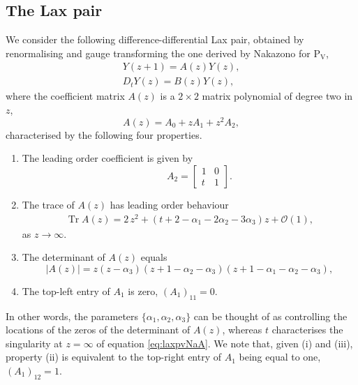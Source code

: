 \documentclass[a4paper,reqno]{amsart}
\numberwithin{equation}{section}
\numberwithin{figure}{section}
\theoremstyle{remark}
\newcommand\Pfive{\textrm{P}_{\textrm{V}}}
\begin{document}
\subsection{The Lax pair} \label{subsect:linP5Na}
We consider the following difference-differential Lax pair, obtained by renormalising and gauge transforming the one derived by Nakazono
\cite{nakazono_lax} for $\Pfive$,
\begin{subequations}\label{eq:laxpvNa}
\begin{align}
    Y(z+1)=A(z)Y(z),\label{eq:laxpvNaA}\\
    D_t Y(z)=B(z)Y(z),\label{eq:laxpvNaB}
\end{align}
\end{subequations}
where the coefficient matrix $A(z)$ is a $2\times 2$ matrix polynomial of degree two in $z$,
\begin{equation*}
        A(z)=A_0+z A_1+z^2A_2,
    \end{equation*}
    characterised by the following four properties.
\begin{enumerate}[label=(\roman*)]
\item The leading order coefficient is given by
\begin{equation*}
    \qquad A_2=\begin{bmatrix}
            1 & 0\\
            t & 1
        \end{bmatrix}.
\end{equation*}
    \item The trace of $A(z)$ has leading order behaviour
   \begin{equation}\label{eq:traceinfpvNAK}
    \begin{aligned}
     \operatorname{Tr}A(z)=2\,z^2+(t+2-\alpha_1-2\alpha_2-3\alpha_3)z+\mathcal{O}(1),
    \end{aligned}
   \end{equation}
    as $z\rightarrow \infty$.
    \item The determinant of $A(z)$ equals
\begin{equation}\label{eq:coefmatrixdetpvNAK}
    |A(z)|=z(z-\alpha_3)(z+1-\alpha_2-\alpha_3)(z+1-\alpha_1-\alpha_2-\alpha_3),
\end{equation}
\item The top-left entry of $A_1$ is zero, $(A_1)_{11}=0$. 
\end{enumerate}
In other words, the parameters $\{\alpha_1,\alpha_2,\alpha_3\}$ can be thought of as controlling the locations of the zeros of the determinant of $A(z)$, whereas $t$ characterises the singularity at $z=\infty$ of equation \eqref{eq:laxpvNaA}.
 We note that, given (i) and (iii), property (ii) is equivalent to the top-right entry of $A_1$ being equal to one, $(A_1)_{12}=1$.
\end{document}
